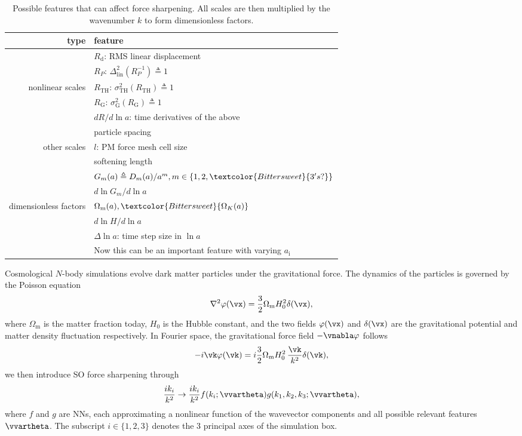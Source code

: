 \documentclass[modern, trackchanges, dvipsnames]{aastex631}
\renewcommand{\d}{d}
\newcommand{\lna}{\ln\!a}
\newcommand{\Omegam}{\Omega_\mathrm{m}}
\newcommand{\OmegaK}{\Omega_K}
\newcommand{\ic}{\mathrm{i}}
\newcommand{\linear}{\mathrm{lin}}
\newcommand{\tophat}{\mathrm{TH}}
\newcommand{\gauss}{\mathrm{G}}
\newcommand{\YL}[1]{\textcolor{Bittersweet}{#1}}
\begin{document}
\begin{table}
  \centering
  \caption{Possible features that can affect force sharpening.
  All scales are then multiplied by the wavenumber $k$ to form dimensionless
  factors.}
  \label{tab:feat}
  \begin{tabular}{rl}
  \toprule
  type & feature \\
  \midrule
  & $R_\mathrm{d}$: RMS linear displacement \\
  \cmidrule(lr){2-2}
  & $R_P$: $\Delta_\linear^2(R_P^{-1}) \triangleq 1$ \\
  \cmidrule(lr){2-2}
  nonlinear scales & $R_\tophat$: $\sigma_\tophat^2(R_\tophat) \triangleq 1$ \\
  \cmidrule(lr){2-2}
  & $R_\gauss$: $\sigma_\gauss^2(R_\gauss) \triangleq 1$ \\
  \cmidrule(lr){2-2}
  & $\d R / \d\lna$: time derivatives of the above \\
  \midrule
  & particle spacing \\
  \cmidrule(lr){2-2}
  other scales & $l$: PM force mesh cell size \\
  \cmidrule(lr){2-2}
  & softening length \\
  \midrule
  & $G_m(a) \triangleq D_m(a) / a^m, m \in \{1, 2, \YL{3's?}\}$ \\
  \cmidrule(lr){2-2}
  & $\d\ln G_m / \d\lna$ \\
  \cmidrule(lr){2-2}
  dimensionless factors & $\Omegam(a), \YL{\OmegaK(a)}$ \\
  \cmidrule(lr){2-2}
  & $\d\ln\!H / \d\lna$ \\
  \cmidrule(lr){2-2}
  & $\Delta\lna$: time step size in $\lna$ \\
  & \YL{Now this can be an important feature with varying $a_\ic$} \\
  \bottomrule
  \end{tabular}
  \end{table}

Cosmological $N$-body simulations evolve dark matter particles under the
gravitational force.
The dynamics of the particles is governed by the Poisson equation
%
\begin{equation}
  \nabla^2 \varphi(\vx) = \frac32 \Omegam H_0^2 \delta(\vx),
\end{equation}
%
where $\Omegam$ is the matter fraction today, $H_0$ is the Hubble
constant, and the two fields $\varphi(\vx)$ and $\delta(\vx)$ are the
gravitational potential and matter density fluctuation respectively.
In Fourier space, the gravitational force field $- \vnabla \varphi$
follows
%
\begin{equation}
- i \vk \varphi(\vk) = i \frac32 \Omegam H_0^2 \,\frac{\vk}{k^2} \delta(\vk),
\end{equation}
%
we then introduce SO force sharpening through
%
\begin{equation}
\frac{i k_i}{k^2} \to \frac{i k_i}{k^2}
  f(k_i; \vvartheta) g(k_1, k_2, k_3; \vvartheta),
\end{equation}
%
where $f$ and $g$ are NNs, each approximating a nonlinear function of
the wavevector components and all possible relevant features
$\vvartheta$.
The subscript $i\in\{1,2,3\}$ denotes the 3 principal axes of the
simulation box.
\end{document}
